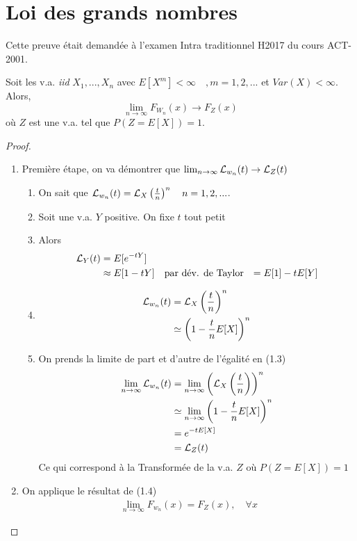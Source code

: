 \section{Loi des grands nombres}
\label{preuve:grand_nombre}
Cette preuve était demandée à l'examen Intra traditionnel H2017 du cours ACT-2001.

\begin{tcolorbox}[title=Théorème, colframe=darkgray, colback=white]
Soit les v.a. \textit{iid} $X_1, ..., X_n$ avec $E[X^m] < \infty \quad, m = 1,2, ...$ et $Var(X) < \infty$. Alors,
\begin{equation}
\lim_{n \to \infty} F_{W_n}(x) \longrightarrow F_Z(x)
\end{equation}
où $Z$ est une v.a. tel que $P(Z = E[X]) = 1$.
\end{tcolorbox}

\begin{proof}

\begin{enumerate}[label=(\arabic*)]
\item Première étape, on va démontrer que $\lim_{n \to \infty} \mathcal{L}_{w_n}(t) \rightarrow \mathcal{L}_Z(t)$
\begin{enumerate}[label=(1.\arabic*)]
\item On sait que $\mathcal{L}_{w_n}(t) = \mathcal{L}_X \left( \frac{t}{n} \right)^n \quad n = 1,2,...$.
\item Soit une v.a. $Y$ positive. On fixe $t$ tout petit
\item Alors
\begin{align*}
\mathcal{L}_Y(t) & = E[e^{-tY}] \\
	& \approx E[1 - tY] \quad \text{par dév. de Taylor}
	& = E[1] - t E[Y] \\
\end{align*}
\item 
\begin{align*}
\mathcal{L}_{w_n}(t) & = \mathcal{L}_X \left( \frac{t}{n} \right)^n  \\
	& \simeq \left(1 - \frac{t}{n} E[X] \right)^n \\
\end{align*}
\item On prends la limite de part et d'autre de l'égalité en (1.3)
\begin{align*}
\lim_{n \to \infty} \mathcal{L}_{w_n}(t) & = \lim_{n \to \infty} \left( \mathcal{L}_X \left( \frac{t}{n} \right) \right)^n \\
	& \simeq \lim_{n \to \infty} \left(1 - \frac{t}{n} E[X] \right)^n \\
	& = e^{-t E[X]} \\
	& = \mathcal{L}_Z(t) \\
\end{align*}
Ce qui correspond à la Transformée de la v.a. $Z$ où $P(Z = E[X]) = 1$
\end{enumerate}
\item On applique le résultat de (1.4)
\begin{align*}
\lim_{n \to \infty} F_{w_n} (x) = F_Z(x), \quad \forall x
\end{align*}
\end{enumerate}
\end{proof}




